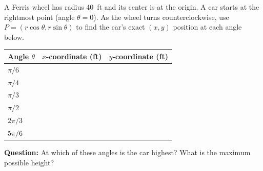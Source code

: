 \documentclass[10pt]{article}
\begin{document}
\vspace{0.1in}

\begin{tcolorbox}[colback=white, colframe=black!40,
    title=\textbf{Tier A --- Ferris Wheel Coordinates},
    fonttitle=\bfseries, arc=2mm, left=3mm, right=3mm, top=2mm, bottom=2mm]
\small
A Ferris wheel has radius 40~ft and its center is at the origin. A car starts at the rightmost point
(angle $\theta = 0$). As the wheel turns counterclockwise, use $P = (r\cos\theta, r\sin\theta)$
to find the car's exact $(x, y)$ position at each angle below.

\vspace{0.08in}
\renewcommand{\arraystretch}{2.0}
\begin{tabularx}{\linewidth}{@{} >{\centering\arraybackslash}p{2.0cm}
    >{\centering\arraybackslash}X >{\centering\arraybackslash}X @{}}
\toprule
\textbf{Angle $\theta$} & \textbf{$x$-coordinate (ft)} & \textbf{$y$-coordinate (ft)} \\
\midrule
$\pi/6$   & \underline{\hspace{2.2cm}} & \underline{\hspace{2.2cm}} \\
$\pi/4$   & \underline{\hspace{2.2cm}} & \underline{\hspace{2.2cm}} \\
$\pi/3$   & \underline{\hspace{2.2cm}} & \underline{\hspace{2.2cm}} \\
$\pi/2$   & \underline{\hspace{2.2cm}} & \underline{\hspace{2.2cm}} \\
$2\pi/3$  & \underline{\hspace{2.2cm}} & \underline{\hspace{2.2cm}} \\
$5\pi/6$  & \underline{\hspace{2.2cm}} & \underline{\hspace{2.2cm}} \\
\bottomrule
\end{tabularx}
\renewcommand{\arraystretch}{1}

\vspace{0.08in}
\textbf{Question:} At which of these angles is the car highest? What is the maximum possible height?

\vspace{0.45in}
\end{tcolorbox}
\end{document}
